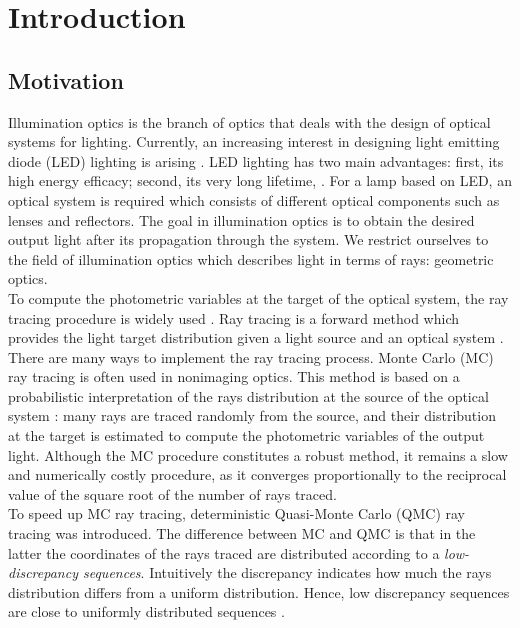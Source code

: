 \chapter{Introduction}
\section{Motivation}
Illumination optics is the branch of optics that deals with the design of optical systems for lighting. 
Currently, an increasing interest in designing light emitting
diode (LED) lighting is arising \cite{moreno2008modeling}. 
LED lighting has two main
advantages: first, its high energy efficacy; second, its very long lifetime, \cite{taguchi2008present, haitz2011solid}. For a lamp based on LED, an optical system is required
which consists of different optical components such
as lenses and reflectors. 
The goal in illumination optics is to
obtain the desired output light after its propagation through the system. 
We restrict ourselves to the field of illumination optics which describes light in terms of rays: geometric optics. 
\\ \indent To compute the photometric variables at the target of the
optical system, the ray tracing procedure is widely used \cite{glassner1989introduction}.
Ray tracing is a forward method which provides the light target distribution given a light source and an optical system \cite{Gross2005Handbook}. 
There are many ways to implement the ray tracing
process. Monte Carlo (MC) ray tracing is often used in nonimaging
optics. This method is based on a probabilistic interpretation
of the rays distribution at the source of the optical
system \cite{liu2010precise,Ting:1}: many rays are traced randomly from the source,
and their distribution at the target is estimated to compute the
photometric variables of the output light. Although the MC
procedure constitutes a robust method, it remains a slow and
numerically costly procedure, as it converges proportionally
to the reciprocal value of the square root of the number of rays
traced. \\ \indent To speed up MC ray tracing, deterministic Quasi-Monte Carlo (QMC) ray tracing was introduced. The difference between MC and QMC is that in the latter the coordinates of the rays traced are distributed according to a \textit{low-discrepancy sequences}. Intuitively the discrepancy indicates how much the rays distribution differs from a uniform distribution.  Hence, low discrepancy sequences are close to uniformly distributed sequences \cite{levy2002introduction}.
